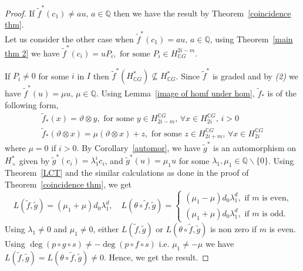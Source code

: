 \documentclass{amsart}
\newcommand{\thmref}[1]{Theorem~\ref{#1}}
\newcommand{\lemref}[1]{Lemma~\ref{#1}}
\newcommand{\corref}[1]{Corollary~\ref{#1}}
\begin{document}
\begin{proof}
	If $\tilde{f}^*(c_1) \neq au, \, a\in \mathbb{Q}$ then we have the result %
by \thmref{coincidence thm}.\\ Let us consider %
the other case when $\tilde{f}^*(c_1) = au, \, a\in \mathbb{Q}$, using \thmref{main thm 2} we have $\tilde{f}^*(c_i) = uP_i, \text{ for some } P_i\in H^{2i-m}_{\mathbb{C}G}.$ 
	
	If $P_i \neq 0$ for some $i$ in $I$ then $\tilde{f}^*(H^*_{\mathbb CG}) \nsubseteq H^*_{\mathbb CG}$. Since $\tilde{f}^*$ is graded and %
by \textit{(2)} we %
have $\tilde{f}^*(u) = \mu u,\, \mu \in \mathbb{Q}$. Using \lemref{image of homf under hom}, $\tilde{f}_*$ is of the following form, \begin{equation}\label{uin CG}
		\begin{split}
			\tilde f_*(x)= \vartheta\otimes y, \text{ for some }y\in H_{2i-m}^{\mathbb CG}, \, \forall x \in H_{2i}^{\mathbb{C}G}, \, i>0\\
			\tilde f_*(\vartheta\otimes x)=\mu(\vartheta\otimes x) +z, \text{ for some }z\in H_{2i+m}^{\mathbb CG},\, \forall x \in H_{2i}^{\mathbb{C}G}
		\end{split}
	\end{equation}
	where $\mu =0$ if $i>0$. By \corref{automor}, we have $\tilde g^*$ is an automorphism on $H^*_{\times}$ given by
	$\tilde g^*(c_i) = \lambda_1^i c_i$, and $\tilde g^*(u) = \mu_1 u$ for some $\lambda_1, \mu_1 \in \mathbb{Q}\backslash \{0\}$. Using \thmref{LCT} and the similar calculations as done in the proof of \thmref{coincidence thm}, we get $$L(\tilde f,\tilde g) =(\mu_1 + \mu) d_0 \lambda_1^d, \quad L(\theta \circ\tilde f,\tilde g) =\begin{cases}
		(\mu_1 - \mu)d_{0} \lambda_1^{d},  \text{ if } m \text{ is even,}\\
		(\mu_1 +\mu)d_{0} \lambda_1^{d},  \text{ if } m \text{ is odd.}
	\end{cases}$$ Using $\lambda_1 \neq 0$ and $\mu_1 \neq 0$, either $L(\tilde f,\tilde g) $ or $ L(\theta \circ\tilde f,\tilde g)$ is non zero if $m$ is even. Using $\deg(p\circ g \circ s)\neq -\deg (p\circ f\circ s)$ i.e. $\mu_1 \neq -\mu$ we have $L(\tilde f, \tilde g) = L(\theta \circ \tilde f, \tilde g) \neq 0$.  Hence, we get the result.
	

\end{proof}
\end{document}
